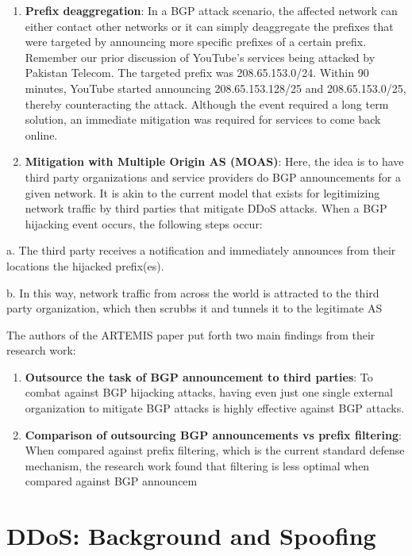 \documentclass[11pt]{article}
\begin{document}
\begin{enumerate}
\item \textbf{Prefix deaggregation}: In a BGP attack scenario, the affected network can either contact other networks or it can simply deaggregate the prefixes that were targeted by announcing more specific prefixes of a certain prefix. Remember our prior discussion of YouTube’s services being attacked by Pakistan Telecom. The targeted prefix was 208.65.153.0/24. Within 90 minutes, YouTube started announcing 208.65.153.128/25 and 208.65.153.0/25, thereby counteracting the attack. Although the event required a long term solution, an immediate mitigation was required for services to come back online.

\item \textbf{Mitigation with Multiple Origin AS (MOAS)}: Here, the idea is to have third party organizations and service providers do BGP announcements for a given network. It is akin to the current model that exists for legitimizing network traffic by third parties that mitigate DDoS attacks. When a BGP hijacking event occurs, the following steps occur:
\end{enumerate}

a. The third party receives a notification and immediately announces from their locations the hijacked prefix(es). 

b. In this way, network traffic from across the world is attracted to the third party organization, which then scrubbs it and tunnels it to the legitimate AS

The authors of the ARTEMIS paper put forth two main findings from their research  work:

\begin{enumerate}
\item \textbf{Outsource the task of BGP announcement to third parties}: To combat against BGP hijacking attacks, having even just one single external organization to mitigate BGP attacks is highly effective against BGP attacks.
\item \textbf{Comparison of outsourcing BGP announcements vs prefix filtering}: When compared against prefix filtering, which is the current standard defense mechanism, the research work found that filtering is less optimal when compared against BGP announcem
\end{enumerate}


\section{DDoS: Background and Spoofing}
\label{sec:org9a01f01}
\end{document}
